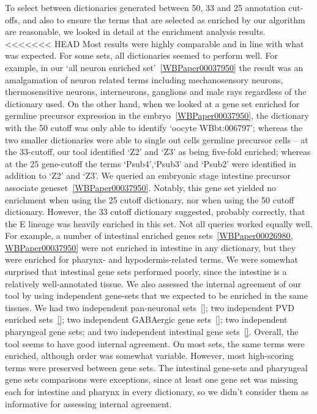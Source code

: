 \documentclass[linenumbers, doublespacing]{bmcart}
\begin{document}
	To select between dictionaries generated between 50, 33 and 25 annotation cut-offs, and also to ensure the terms that are selected as enriched by our algorithm are reasonable, we looked in detail at the enrichment analysis results. 
<<<<<<< HEAD
	Most results were highly comparable and in line with what was expected. For some sets, all dictionaries seemed to perform well. For example, in our `all neuron enriched set'~\ref{WBPaper00037950} the result was an amalgamation of neuron related terms including mechanosensory neurons, thermosensitive neurons, interneurons, ganglions and male rays regardless of the dictionary used. On the other hand, when we looked at a gene set enriched for germline precursor expression in the embryo~\ref{WBPaper00037950}, the dictionary with the 50 cutoff was only able to identify `oocyte WBbt:006797'; whereas the two smaller dictionaries were able to single out cells germline precursor cells -- at the 33-cutoff, our tool identified `Z2' and `Z3' as being five-fold enriched; whereas at the 25 gene-cutoff the terms `Psub4',`Psub3' and `Psub2' were identified in addition to `Z2' and `Z3'.
	We queried an embryonic stage intestine precursor associate geneset~\ref{WBPaper00037950}. Notably, this gene set yielded no enrichment when using the 25 cutoff dictionary, nor when using the 50 cutoff dictionary. However, the 33 cutoff dictionary suggested, probably correctly, that the E lineage was heavily enriched in this set. 
	Not all queries worked equally well. For example, a number of intestinal enriched genes sets~\ref{WBPaper00026980, WBPaper00037950} were not enriched in intestine in any dictionary, but they were enriched for pharynx- and hypodermis-related terms. We were somewhat surprised that intestinal gene sets performed poorly, since the intestine is a relatively well-annotated tissue.
	We also assessed the internal agreement of our tool by using independent gene-sets that we expected to be enriched in the same tissues. We had two independent pan-neuronal sets~\ref{}; two independent PVD enriched sets~\ref{}; two independent GABAergic gene sets~\ref{}; two independent pharyngeal gene sets; and two independent intestinal gene sets~\ref{}. Overall, the tool seems to have good internal agreement. On most sets, the same terms were enriched, although order was somewhat variable. However, most high-scoring terms were preserved between gene sets. The intestinal gene-sets and pharyngeal gene sets comparisons were exceptions, since at least one gene set was missing each for intestine and pharynx in every dictionary, so we didn't consider them as informative for assessing internal agreement. 
	
\end{document}
